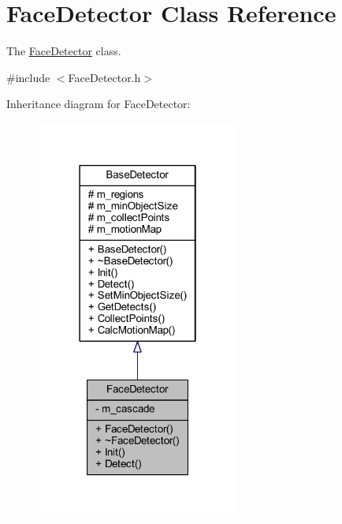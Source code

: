 \hypertarget{class_face_detector}{}\section{Face\+Detector Class Reference}
\label{class_face_detector}


The \mbox{\hyperlink{class_face_detector}{Face\+Detector}} class.  




{\ttfamily \#include $<$Face\+Detector.\+h$>$}



Inheritance diagram for Face\+Detector\+:\nopagebreak
\begin{figure}[H]
\begin{center}
\leavevmode
\includegraphics[width=190pt]{class_face_detector__inherit__graph}
\end{center}
\end{figure}


